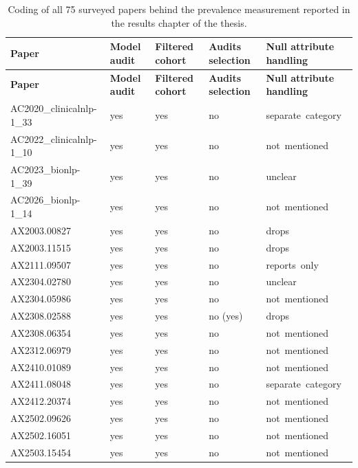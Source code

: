 \singlespacing
\begin{longtable}{@{}p{0.9in}p{0.42in}p{0.42in}p{0.55in}p{1.7in}@{}}
\caption[Survey coding table]{Coding of all 75 surveyed papers behind the
prevalence measurement reported in the results chapter of the thesis.}
\label{tab:survey-coding}\\
\textbf{Paper} & \textbf{Model audit} & \textbf{Filtered cohort} & \textbf{Audits selection} & \textbf{Null attribute handling}\\
\midrule
\endfirsthead
\textbf{Paper} & \textbf{Model audit} & \textbf{Filtered cohort} & \textbf{Audits selection} & \textbf{Null attribute handling}\\
\midrule
\endhead
AC2020\_clinicalnlp-1\_33 & yes & yes & no & separate\ category\\
AC2022\_clinicalnlp-1\_10 & yes & yes & no & not\ mentioned\\
AC2023\_bionlp-1\_39 & yes & yes & no & unclear\\
AC2026\_bionlp-1\_14 & yes & yes & no & not\ mentioned\\
AX2003.00827 & yes & yes & no & drops\\
AX2003.11515 & yes & yes & no & drops\\
AX2111.09507 & yes & yes & no & reports\ only\\
AX2304.02780 & yes & yes & no & unclear\\
AX2304.05986 & yes & yes & no & not\ mentioned\\
AX2308.02588 & yes & yes & no (yes) & drops\\
AX2308.06354 & yes & yes & no & not\ mentioned\\
AX2312.06979 & yes & yes & no & not\ mentioned\\
AX2410.01089 & yes & yes & no & not\ mentioned\\
AX2411.08048 & yes & yes & no & separate\ category\\
AX2412.20374 & yes & yes & no & not\ mentioned\\
AX2502.09626 & yes & yes & no & not\ mentioned\\
AX2502.16051 & yes & yes & no & not\ mentioned\\
AX2503.15454 & yes & yes & no & not\ mentioned\\

\end{longtable}

